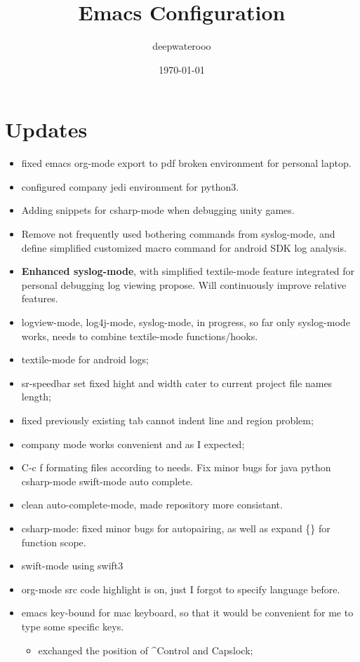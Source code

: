 \documentclass[9pt, b5paper]{article}
\author{deepwaterooo}
\date{\today}
\title{Emacs Configuration}
\begin{document}
\maketitle
\tableofcontents


\section{Updates}
\label{sec-1}
\begin{itemize}
\item fixed emacs org-mode export to pdf broken environment for personal laptop.
\item configured company jedi environment for python3.
\item Adding snippets for csharp-mode when debugging unity games.
\item Remove not frequently used bothering commands from syslog-mode, and define simplified customized macro command for android SDK log analysis.
\item \textbf{Enhanced syslog-mode}, with simplified textile-mode feature integrated for personal debugging log viewing propose. Will continuously improve relative features.
\item logview-mode, log4j-mode, syslog-mode, in progress, so far only syslog-mode works, needs to combine textile-mode functions/hooks.
\item textile-mode for android logs;
\item sr-speedbar set fixed hight and width cater to current project file names length;
\item fixed previously existing tab cannot indent line and region problem;
\item company mode works convenient and as I expected;
\item C-c f formating files according to needs. Fix minor bugs for java python csharp-mode swift-mode auto complete.
\item clean auto-complete-mode, made repository more consistant.
\item csharp-mode: fixed minor bugs for autopairing, as well as expand \{\} for function scope.
\item swift-mode using swift3
\item org-mode src code highlight is on, just I forgot to specify language before.
\item emacs key-bound for mac keyboard, so that it would be convenient for me to type some specific keys. 
\begin{itemize}
\item exchanged the position of \^{}Control and Capslock;

\end{itemize}
\end{itemize}
\end{document}
